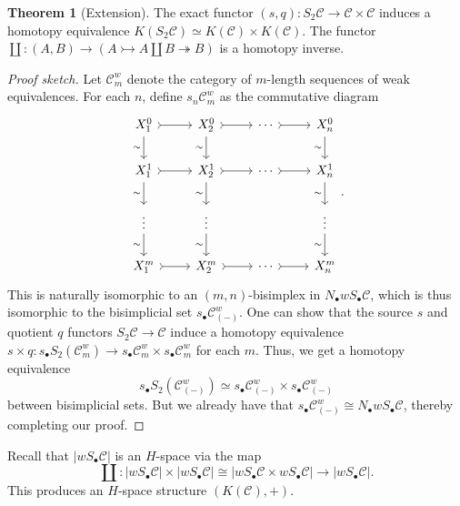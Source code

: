 \documentclass[10pt,letterpaper,cm]{nupset}
\theoremstyle{definition}
\theoremstyle{theorem}
\newtheorem{theorem}[definition]{Theorem}
\theoremstyle{remark}
\newcommand{\1}{\mathbf{1}}
\renewcommand{\c}{\mathscr{C}}
\newcommand{\0}{\vec 0}
\begin{document}
\begin{theorem}[Extension]\label{ext}
The exact functor $\left(s, q\right) : S_2{\c} \to \c \times \c$ induces  a homotopy equivalence $K(S_2{\c}) \simeq K(\c) \times K(\c)$. The functor $\coprod : \left(A, B\right) \to \left(A \rightarrowtail A \coprod B \twoheadrightarrow  B\right)$ is a homotopy inverse.
\end{theorem}
\begin{proof}[Proof sketch]
Let $\c^w_m$ denote the category of $m$-length sequences of weak equivalences. For each $n$, define $s_n\c^w_m$ as the commutative diagram
\[
\begin{tikzcd}
 X_1^0 \arrow[d, "\sim"'] \arrow[r, tail] & X_2^0 \arrow[r, tail] \arrow[d, "\sim"'] & \cdots \arrow[r, tail] & X_n^0 \arrow[d, "\sim"'] \\
X_1^1 \arrow[d, "\sim"'] \arrow[r, tail] & X_2^1 \arrow[r, tail] \arrow[d, "\sim"'] & \cdots \arrow[r, tail] & X_n^1 \arrow[d, "\sim"'] \\
  \vdots \arrow[d, "\sim"'] & \vdots \arrow[d, "\sim"'] &  & \vdots \arrow[d, "\sim"'] \\
 X_1^m \arrow[r, tail] & X_2^m \arrow[r, tail] & \cdots \arrow[r, tail] & X_n^m
\end{tikzcd}
.\]
This is naturally isomorphic to an $\left(m, n\right)$-bisimplex in $N_{\bullet}w S_{\bullet}\c$, which is thus isomorphic to the bisimplicial set $s_{\bullet}\c^w_{(-)}$. One can show that the source $s$ and quotient $q$ functors  $S_2{\c} \to \c$ induce a homotopy equivalence $s \times q : s_{\bullet}S_2(\c^w_m) \to s_{\bullet}\c^w_m \times s_{\bullet}\c^w_m$ for each $m$. Thus, we get a homotopy equivalence  $$s_{\bullet}S_2(\c^w_{(-)}) \simeq s_{\bullet}\c^w_{(-)} \times s_{\bullet}\c^w_{(-)}$$ between bisimplicial sets. But we already have that $s_{\bullet}\c^w_{(-)} \cong N_{\bullet}w S_{\bullet}\c$, thereby completing our proof.
\end{proof}

\bigskip

Recall that $\left\lvert{wS_{\bullet} \c}\right\rvert$ is an $H$-space via the map 
\[ \label{eqn:HS} \coprod: \left\lvert{wS_{\bullet} \c}\right\rvert \times \left\lvert{wS_{\bullet} \c}\right\rvert \cong \left\lvert{wS_{\bullet} \c \times  wS_{\bullet} \c}\right\rvert\to \left\lvert{wS_{\bullet} \c}\right\rvert.
\tag{$\star$}\] This produces an $H$-space structure $\left(K(\c), +\right)$.

   {\bigRelbar\bigRelbar{\bigtwoarrowsleft\rightarrow\rightarrow}}
\end{document}
